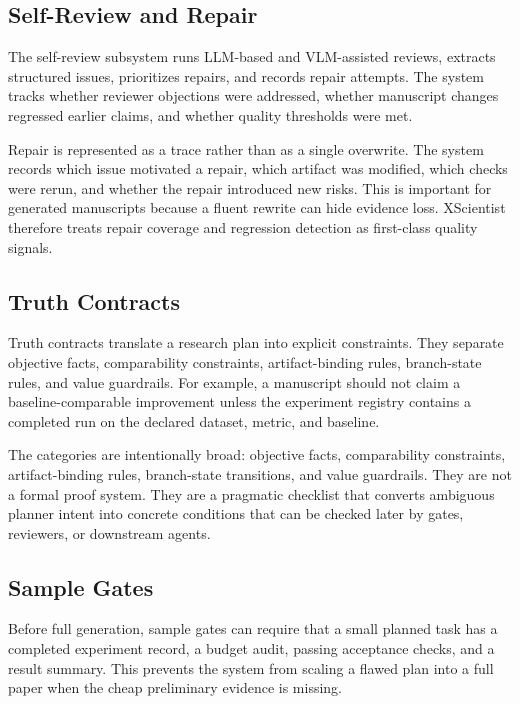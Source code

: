 \documentclass[11pt]{article}
\begin{document}
\subsection{Self-Review and Repair}

The self-review subsystem runs LLM-based and VLM-assisted reviews, extracts
structured issues, prioritizes repairs, and records repair attempts. The
system tracks whether reviewer objections were addressed, whether manuscript
changes regressed earlier claims, and whether quality thresholds were met.

Repair is represented as a trace rather than as a single overwrite. The
system records which issue motivated a repair, which artifact was modified,
which checks were rerun, and whether the repair introduced new risks. This is
important for generated manuscripts because a fluent rewrite can hide evidence
loss. XScientist therefore treats repair coverage and regression detection as
first-class quality signals.

\subsection{Truth Contracts}

Truth contracts translate a research plan into explicit constraints. They
separate objective facts, comparability constraints, artifact-binding rules,
branch-state rules, and value guardrails. For example, a manuscript should not
claim a baseline-comparable improvement unless the experiment registry
contains a completed run on the declared dataset, metric, and baseline.

The categories are intentionally broad: objective facts, comparability
constraints, artifact-binding rules, branch-state transitions, and value
guardrails. They are not a formal proof system. They are a pragmatic checklist
that converts ambiguous planner intent into concrete conditions that can be
checked later by gates, reviewers, or downstream agents.

\subsection{Sample Gates}

Before full generation, sample gates can require that a small planned task
has a completed experiment record, a budget audit, passing acceptance checks,
and a result summary. This prevents the system from scaling a flawed plan into
a full paper when the cheap preliminary evidence is missing.
\end{document}
